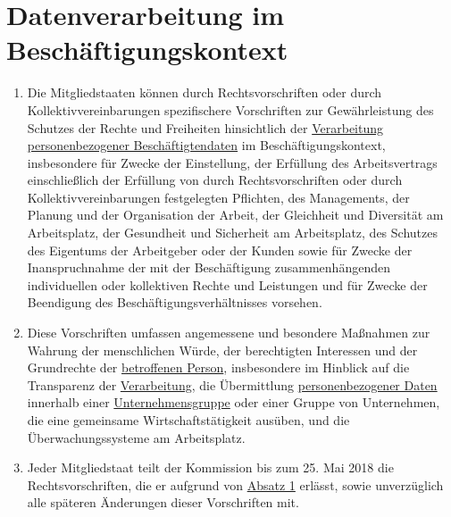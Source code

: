 \chapter{Datenverarbeitung im Beschäftigungskontext}
\label{ch:88}


\begin{enumerate}

  \item Die Mitgliedstaaten können durch Rechtsvorschriften oder durch Kollektivvereinbarungen spezifischere
   Vorschriften zur Gewährleistung des Schutzes der Rechte und Freiheiten hinsichtlich der \hyperref[itm:04-2]{Verarbeitung}
   \hyperref[itm:04-1]{personenbezogener Beschäftigtendaten} im Beschäftigungskontext, insbesondere für Zwecke der Einstellung, der
   Erfüllung des Arbeitsvertrags einschließlich der Erfüllung von durch Rechtsvorschriften oder durch
   Kollektivvereinbarungen festgelegten Pflichten, des Managements, der Planung und der Organisation der Arbeit, der
   Gleichheit und Diversität am Arbeitsplatz, der Gesundheit und Sicherheit am Arbeitsplatz, des Schutzes des Eigentums
   der Arbeitgeber oder der Kunden sowie für Zwecke der Inanspruchnahme der mit der Beschäftigung zusammenhängenden
   individuellen oder kollektiven Rechte und Leistungen und für Zwecke der Beendigung des Beschäftigungsverhältnisses
   vorsehen.
  \label{itm:88-1}

  \item Diese Vorschriften umfassen angemessene und besondere Maßnahmen zur Wahrung der menschlichen Würde, der
   berechtigten Interessen und der Grundrechte der \hyperref[itm:04-1]{betroffenen Person}, insbesondere im Hinblick auf die Transparenz der
   \hyperref[itm:04-2]{Verarbeitung}, die Übermittlung \hyperref[itm:04-1]{personenbezogener Daten} innerhalb einer \hyperref[itm:04-19]{Unternehmensgruppe} oder einer Gruppe von
   Unternehmen, die eine gemeinsame Wirtschaftstätigkeit ausüben, und die Überwachungssysteme am Arbeitsplatz.
  \label{itm:88-2}

  \item Jeder Mitgliedstaat teilt der Kommission bis zum 25. Mai 2018 die Rechtsvorschriften, die er aufgrund von
   \hyperref[itm:88-1]{Absatz 1} erlässt, sowie unverzüglich alle späteren Änderungen dieser Vorschriften mit.
  \label{itm:88-3}

\end{enumerate}


